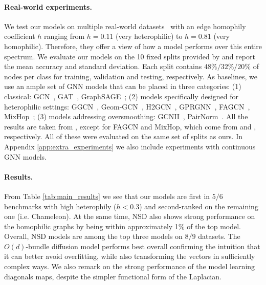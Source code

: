 \documentclass{article}
\begin{document}
\paragraph{Real-world experiments.} We test our models on multiple real-world datasets~\citep{rozemberczki2021multi, pei2020geom, namata2012query, tang2009social, sen2008collective} with an edge homophily coefficient $h$ ranging from $h=0.11$ (very heterophilic) to $h=0.81$ (very homophilic). Therefore, they offer a view of how a model performs over this entire spectrum. We evaluate our models on the 10 fixed splits provided by \citet{pei2020geom} and report the mean accuracy and standard deviation. Each split contains $48\%/32\%/20\%$ of nodes per class for training, validation and testing, respectively. As baselines, we use an ample set of GNN models that can be placed in three categories: (1) classical: GCN~\citep{kipf2017graph}, GAT~\citep{velivckovic2017graph}, GraphSAGE~\citep{hamilton2017representation}; (2) models specifically designed for heterophilic settings: GGCN~\citep{yan2021two}, Geom-GCN~\citep{pei2020geom}, H2GCN~\citep{zhu2020beyond}, GPRGNN~\citep{chien2021adaptive}, FAGCN~\citep{fagcn2021}, MixHop~\citep{mixhop}; (3) models addressing oversmoothing: GCNII~\citep{pmlr-v119-chen20v}, PairNorm~\citep{Zhao2020PairNorm:}. All the results are taken from \citet{yan2021two}, except for FAGCN and MixHop, which come from \citet{lingam2021simple} and \citet{zhu2020beyond}, respectively. All of these were evaluated on the same set of splits as ours. In Appendix \ref{app:extra_experiments} we also include experiments with continuous GNN models. 
\vspace{-5pt}

\paragraph{Results.} From Table \ref{tab:main_results} we see that our models are first in $5/6$ benchmarks with high heterophily ($h < 0.3$) and second-ranked on the remaining one (i.e. Chameleon). At the same time, NSD also shows strong performance on the homophilic graphs by being within approximately 1\% of the top model. Overall, NSD models are among the top three models on $8/9$ datasets. 
The $O(d)$-bundle diffusion model performs best overall confirming the intuition that it can better avoid overfitting, while also transforming the vectors in sufficiently complex ways. We also remark on the strong performance of the model learning diagonals maps, despite the simpler functional form of the Laplacian.
\end{document}

